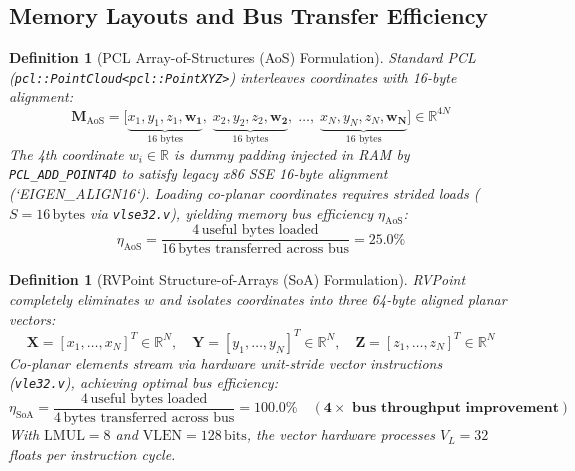 \documentclass[11pt,a4paper]{article}
\newtheorem{definition}[theorem]{Definition}
\begin{document}
\subsection{Memory Layouts and Bus Transfer Efficiency}
\begin{definition}[PCL Array-of-Structures (AoS) Formulation]
Standard PCL (\texttt{pcl::PointCloud<pcl::PointXYZ>}) interleaves coordinates with 16-byte alignment:
\begin{equation}
\mathbf{M}_{\text{AoS}} = \Big[ \underbrace{x_1, y_1, z_1, \mathbf{w_1}}_{16\text{ bytes}}, \; \underbrace{x_2, y_2, z_2, \mathbf{w_2}}_{16\text{ bytes}}, \; \dots, \; \underbrace{x_N, y_N, z_N, \mathbf{w_N}}_{16\text{ bytes}} \Big] \in \mathbb{R}^{4N}
\label{eq:aos_layout}
\end{equation}
The 4th coordinate $w_i \in \mathbb{R}$ is dummy padding injected in RAM by \texttt{PCL\_ADD\_POINT4D} to satisfy legacy x86 SSE 16-byte alignment (`EIGEN_ALIGN16`). Loading co-planar coordinates requires strided loads ($S = 16\,\text{bytes}$ via \texttt{vlse32.v}), yielding memory bus efficiency $\eta_{\text{AoS}}$:
\begin{equation}
\eta_{\text{AoS}} = \frac{4\,\text{useful bytes loaded}}{16\,\text{bytes transferred across bus}} = 25.0\%
\end{equation}
\end{definition}

\begin{definition}[RVPoint Structure-of-Arrays (SoA) Formulation]
RVPoint completely eliminates $w$ and isolates coordinates into three 64-byte aligned planar vectors:
\begin{equation}
\mathbf{X} = [x_1, \dots, x_N]^T \in \mathbb{R}^N, \quad \mathbf{Y} = [y_1, \dots, y_N]^T \in \mathbb{R}^N, \quad \mathbf{Z} = [z_1, \dots, z_N]^T \in \mathbb{R}^N
\label{eq:soa_layout}
\end{equation}
Co-planar elements stream via hardware unit-stride vector instructions (\texttt{vle32.v}), achieving optimal bus efficiency:
\begin{equation}
\eta_{\text{SoA}} = \frac{4\,\text{useful bytes loaded}}{4\,\text{bytes transferred across bus}} = 100.0\% \quad (\mathbf{4\times \text{ bus throughput improvement}})
\end{equation}
With $\text{LMUL} = 8$ and $\text{VLEN} = 128\,\text{bits}$, the vector hardware processes $V_L = 32$ floats per instruction cycle.
\end{definition}
\end{document}
